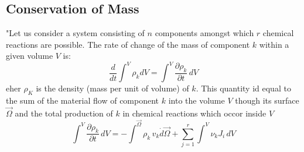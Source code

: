 \subsection{Conservation of Mass}

"Let us consider a system consisting of $n$ components amongst which $r$ chemical reactions are possible. 
The rate of change of the mass of component $k$ within a given volume $V$ is:
\begin{equation}
\frac{d}{dt}\int^V \rho_k dV = \int^V \frac{\partial \rho_k}{\partial t}\, dV
\label{dGM1}
\end{equation}
eher $\rho_K$ is the density (mass per unit of volume) of $k$. This quantity id equal to the sum of the material flow of component $k$ into the volume $V$ though its surface $\vec{\Omega}$ and the total production of $k$ in chemical reactions which occor inside $V$
\begin{equation}
\int^V \frac{\partial \rho_k}{\partial t}\, dV = - \int^\vec{\Omega} \rho_k\, v_k \dot d\vec{\Omega} + \sum_{j=1}^r \int^V \nu_k J_i\, dV
\label{dGM2}
\end{equation}
